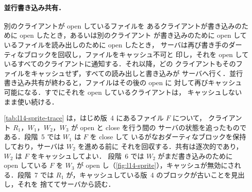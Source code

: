 \documentclass[../main.tex]{subfiles}
\begin{document}
\paragraph{並行書き込み共有．}別のクライアントが open しているファイルを
あるクライアントが書き込みのために open したとき，あるいは別のクライアント
が書き込みのために open しているファイルを読み出しのために open したとき，
サーバは再び書き手のダーティなブロックを回収し，ファイルをキャッシュ不可と
印し，それを open しているすべてのクライアントに通知する．それ以降，どの
クライアントもそのファイルをキャッシュせず，すべての読み出しと書き込みが
サーバへ行く．並行書き込み共有が終わると，ファイルはその後の open に
対して再びキャッシュ可能になる．すでにそれを open しているクライアントは，
キャッシュしないまま使い続ける．

\begin{example}
  \cref{tab:l14-sprite-trace} は，はじめ版~4 にあるファイル $F$ について，
  クライアント $R_1$，$W_1$，$W_2$，$W_3$ が open と close を行う間の
  サーバの状態を追ったものである．段階~5 では $W_1$ は $F$ を close して
  いるがなおダーティなブロックを保持しており，サーバは $W_2$ を進める前に
  それを回収する．共有は逐次的であり，$W_2$ は $F$ をキャッシュしてよい．
  段階~6 では $W_2$ がまだ書き込みのために open している $F$ を $W_3$ が
  open し（\cref{fig:l14-sprite}），キャッシュが無効にされる．段階~7 では
  $R_1$ が，キャッシュしている版~4 のブロックが古いことを見出し，それを
  捨ててサーバから読む．
\end{example}
\end{document}
